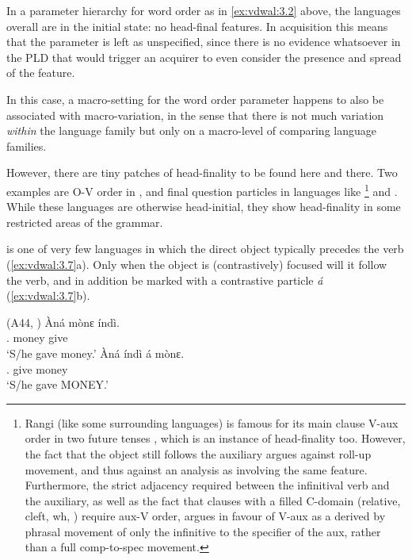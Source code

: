 \documentclass[output=paper]{langsci/langscibook}
\begin{document}
In a parameter hierarchy for word order as in \eqref{ex:vdwal:3.2} above, the 
languages overall are in the initial state: no head-final features. In
acquisition this means that the parameter is left as unspecified, since there
is no evidence whatsoever in the \gls{PLD} that would trigger an acquirer to even
consider the presence and spread of the feature.

In this case, a macro-setting for the word order parameter happens to also be
associated with macro-variation, in the sense that there is not much variation
\emph{within} the  language family but only on a macro-level of comparing
language families.

However, there are tiny patches of head-finality to be found here and there.
Two examples are O-V order in , and final question particles in
languages like \footnote{Rangi (like some surrounding languages) is
    famous for its main clause V-aux order in two future tenses
    \citep{Gibson2016}, which is an instance of head-finality too. However, the
    fact that the object still follows the auxiliary argues
    against roll-up movement, and thus against an analysis
    as involving the same feature. Furthermore, the strict adjacency required
    between the infinitival verb and the auxiliary, as well as
    the fact that clauses with a filled C-domain (relative, cleft,
    wh, ) require aux-V order,  argues in favour of V-aux as a
derived by phrasal movement of only the infinitive to the
specifier of the aux, rather than a full comp-to-spec movement.} and
.  While these languages are otherwise head-initial, they show
head-finality in some restricted areas of the grammar.

 is one of very few  languages in which the direct object typically
precedes the verb (\ref{ex:vdwal:3.7}a). Only when the object is (contrastively)
focused will it follow the verb, and in addition be marked with a contrastive
particle \emph{á} (\ref{ex:vdwal:3.7}b).

\ea\label{bkm:Ref373494395}\label{ex:vdwal:3.7} (A44, \citealt[126]{Mous1997})
    \ea
    \gll 	\`{A}ná  mònɛ  índì.\\
            \Tsg{}.\Pst{}  money  give\\
    \glt    \enquote*{S/he gave money.}
    \ex
    \gll 	\`{A}ná  índì  á  mònɛ.\\
            \Tsg{}.\Pst{}  give  \Ptcl{}  money\\
    \glt    \enquote*{S/he gave MONEY.}
    \z
\z
\end{document}
